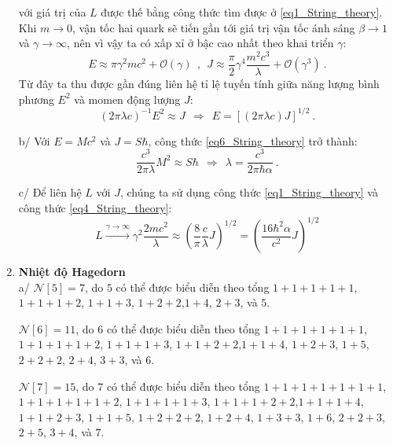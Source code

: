 \begin{enumerate}
    với giá trị của $L$ được thế bằng công thức tìm được ở \eqref{eq1_String_theory}. Khi $m \rightarrow 0$, vận tốc hai quark sẽ tiến gần tới giá trị vận tốc ánh sáng $\beta \rightarrow 1$ và $\gamma \rightarrow \infty$, nên vì vậy ta có xấp xỉ ở bậc cao nhất theo khai triển $\gamma$:
    \begin{equation} \label{eq5_String_theory}
       E \approx \pi \gamma^2 m c^2 + \mathcal{O}(\gamma) \ \ , \ \ J  \approx \frac{\pi}{2} \gamma^4 \frac{m^2 c^3}{\lambda} + \mathcal{O}(\gamma^3) \ .
    \end{equation}
    Từ đây ta thu được gần đúng liên hệ tỉ lệ tuyến tính giữa năng lượng bình phương $E^2$ và momen động lượng $J$:
    \begin{equation} \label{eq6_String_theory}
        \left(2\pi \lambda c\right)^{-1} E^2 \approx J \ \ \Longrightarrow \ \ E = \left[ \left(2\pi \lambda c\right) J \right]^{1/2} \ .
    \end{equation}

    b/ Với $E=Mc^2$ và $J=S \hbar$, công thức \eqref{eq6_String_theory} trở thành:
    \begin{equation} \label{eq7_String_theory}
        \frac{c^3}{2\pi \lambda} M^2 \approx S \hbar \ \ \Longrightarrow \ \ \lambda = \frac{c^3}{2\pi \hbar \alpha} \ .
    \end{equation}

    c/ Để liên hệ $L$ với $J$, chúng ta sử dụng công thức \eqref{eq1_String_theory} và công thức \eqref{eq4_String_theory}:
    \begin{equation} \label{eq8_String_theory}
    L \xrightarrow{\gamma \rightarrow \infty} \gamma^2 \frac{2mc^2}{\lambda} \approx \left( \frac{8}{\pi}\frac{c}{\lambda} J \right)^{1/2} = \left( \frac{16\hbar^2 \alpha}{c^2} J \right)^{1/2}
    \end{equation}
    
    \item \textbf{Nhiệt độ Hagedorn}\\
    a/ $\mathcal{N}[5]=7$, do $5$ có thể được biểu diễn theo tổng $1+1+1+1+1$, $1+1+1+2$, $1+1+3$, $1+2+2$,$1+4$, $2+3$, và $5$. 
    
    $\mathcal{N}[6]=11$, do $6$ có thể được biểu diễn theo tổng $1+1+1+1+1+1$, $1+1+1+1+2$, $1+1+1+3$, $1+1+2+2$,$1+1+4$, $1+2+3$, $1+5$, $2+2+2$, $2+4$, $3+3$, và $6$. 
    
    $\mathcal{N}[7]=15$, do $7$ có thể được biểu diễn theo tổng $1+1+1+1+1+1+1$, $1+1+1+1+1+2$, $1+1+1+1+3$, $1+1+1+2+2$,$1+1+1+4$, $1+1+2+3$, $1+1+5$, $1+2+2+2$, $1+2+4$, $1+3+3$, $1+6$, $2+2+3$, $2+5$, $3+4$, và $7$.


\end{enumerate}
